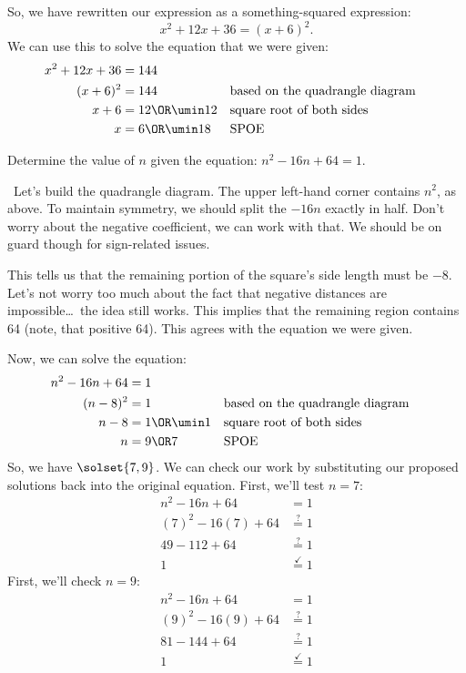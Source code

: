 
So, we have rewritten our expression as a something-squared expression:
\[x^2 + 12x + 36 = (x+6)^2.\]
We can use this to solve the equation that we were given:
\begin{align*}
x^2 + 12x + 36 &= 144
\\
(x+6)^2 &= 144
&&\text{based on the quadrangle diagram}
\\
x+6 &= 12 \OR \umin12
&&\text{square root of both sides}
\\
x &= 6 \OR \umin18
&&\text{SPOE}
\end{align*}

\begin{boxex}
Determine the value of $n$ given the equation: $n^2 - 16n + 64 = 1$.

\exsoln\ Let's build the quadrangle diagram. The upper left-hand corner contains $n^2$, as above. To maintain symmetry, we should split the $-16n$ exactly in half. Don't worry about the negative coefficient, we can work with that. We should be on guard though for sign-related issues.


This tells us that the remaining portion of the square's side length must be $-8$. Let's not worry too much about the fact that negative distances are impossible\ldots\ the idea still works. This implies that the remaining region contains 64 (note, that positive 64). This agrees with the equation we were given.


Now, we can solve the equation:
\begin{align*}
n^2 -16n +64 &= 1
\\
(n-8)^2 &= 1
&&\text{based on the quadrangle diagram}
\\
n-8 &= 1 \OR \umin1
&&\text{square root of both sides}
\\
n &= 9 \OR 7
&&\text{SPOE}
\end{align*}
So, we have $\solset{7,9}$. We can check our work by substituting our proposed solutions back into the original equation. First, we'll test $n=7$:
\begin{align*}
n^2 -16n +64 &= 1
\\
(7)^2 - 16(7) + 64 &\overset{?}{=} 1
\\
49 - 112 + 64 &\overset{?}{=} 1
\\
1 &\overset{\checkmark}{=} 1
\end{align*}
First, we'll check $n=9$:
\begin{align*}
n^2 -16n +64 &= 1
\\
(9)^2 - 16(9) + 64 &\overset{?}{=} 1
\\
81 - 144 + 64 &\overset{?}{=} 1
\\
1 &\overset{\checkmark}{=} 1
\end{align*}
\end{boxex}

